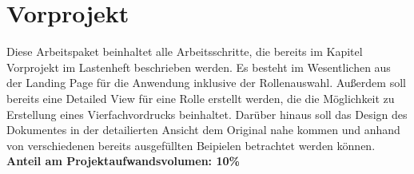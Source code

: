 \section{Vorprojekt} 
Diese Arbeitspaket beinhaltet alle Arbeitsschritte, die bereits im Kapitel
Vorprojekt im Lastenheft beschrieben werden. Es besteht 
im Wesentlichen aus der Landing Page für die Anwendung inklusive der 
Rollenauswahl. Außerdem soll bereits eine Detailed View für eine Rolle 
erstellt werden, die die Möglichkeit zu Erstellung eines Vierfachvordrucks 
beinhaltet. Darüber hinaus soll das Design des Dokumentes in der detailierten 
Ansicht dem Original nahe kommen und anhand von verschiedenen bereits 
ausgefüllten Beipielen betrachtet werden können.
\textbf{Anteil am Projektaufwandsvolumen: 10\%}